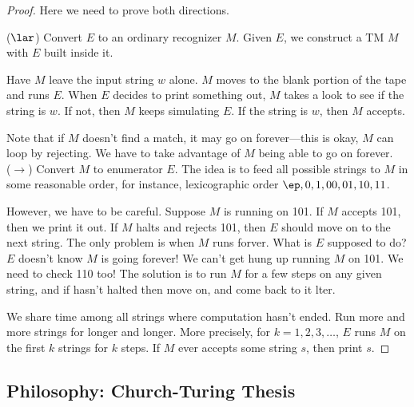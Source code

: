 \begin{proof}
Here we need to prove both directions.

($\lar$) Convert $E$ to an ordinary recognizer $M$. Given $E$, we construct a TM $M$ with $E$ built inside it. 

Have $M$ leave the input string $w$ alone. $M$ moves to the blank portion of the tape and runs $E$. When $E$ decides to print something out, $M$ takes a look to see if the string is $w$. If not, then $M$ keeps simulating $E$. If the string is $w$, then $M$ accepts.

Note that if $M$ doesn't find a match, it may go on forever---this is okay, $M$ can loop by rejecting. We have to take advantage of $M$ being able to go on forever.\\

($\to$) Convert $M$ to enumerator $E$. The idea is to feed all possible strings to $M$ in some reasonable order, for instance, lexicographic order $\ep,0,1,00,01,10,11$.

However, we have to be careful. Suppose $M$ is running on 101. If $M$ accepts 101, then we print it out. If $M$ halts and  rejects 101, then $E$ should move on to the next string. The only problem is when $M$ runs forver. What is $E$ supposed to do? $E$ doesn't know $M$ is going forever! We can't get hung up running $M$ on 101. We need to check 110 too! The solution is to run $M$ for a few steps on any given string, and if hasn't halted then move on, and come back to it lter.

We share time among all strings where computation hasn't ended. Run more and more strings for longer and longer.
More precisely, %
%
for $k=1,2,3,\ldots $, $E$ runs $M$ on the first $k$ strings for $k$ steps. If $M$ ever accepts some string $s$, then print $s$. %
\end{proof}
\subsection{Philosophy: Church-Turing Thesis}

